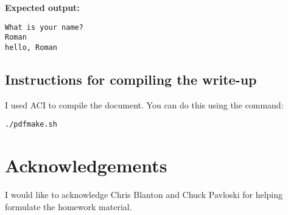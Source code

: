 \documentclass{article}
\begin{document}
\begin{spacing}{1.1}
\textbf{Expected output:}
\begin{verbatim}
What is your name?
Roman
hello, Roman
\end{verbatim}

\subsection{Instructions for compiling the write-up}

I used ACI to compile the document.  You can do this using the command:
\begin{verbatim}
./pdfmake.sh
\end{verbatim}

\section{Acknowledgements}

I would like to acknowledge Chris Blanton and Chuck Pavloski for helping formulate the homework material.



\end{spacing}


\end{document}
